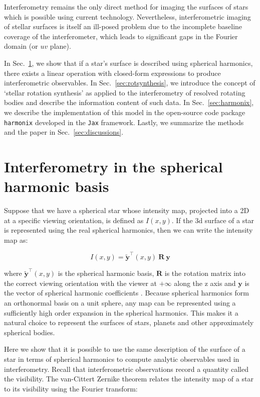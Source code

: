 \documentclass[modern]{aastex631}
\begin{document}
Interferometry remains the only direct method for imaging the surfaces of stars which is possible using current technology. Nevertheless, interferometric imaging of stellar surfaces is itself an ill-posed problem due to the incomplete baseline coverage of the interferometer, which leads to significant gaps in the Fourier domain (or $uv$ plane). 

In Sec.~\ref{sec:maps}, we show that if a star's surface is described using spherical harmonics, there exists a linear operation with closed-form expressions to produce interferometric observables. In Sec.~\ref{sec:rotsynthesis}, we introduce the concept of `stellar rotation synthesis' as applied to the interferometry of resolved rotating bodies and describe the information content of such data. In  Sec.~\ref{sec:harmonix}, we describe the implementation of this model in the open-source code package \texttt{harmonix} developed in the \texttt{Jax} framework. Lastly, we summarize the methods and the paper in Sec.~\ref{sec:discussions}.
\section{Interferometry in the spherical harmonic basis}
\label{sec:maps}

Suppose that we have a spherical star whose intensity map, projected into a 2D at a specific viewing orientation, is defined as $I(x,y)$. If the 3d surface of a star is represented using the real spherical harmonics, then we can write the intensity map as:
 
\begin{equation}
    I(x,y) = \mathbf{\tilde{y}}^\top(x,y) \ \mathbf{R} \ \mathbf{y}
\end{equation}

where $\mathbf{\tilde{y}}^\top(x,y)$ is the spherical harmonic basis, $\mathbf{R}$ is the rotation matrix into the correct viewing orientation with the viewer at $+\infty$ along the z axis and $\mathbf{y}$ is the vector of spherical harmonic coefficients \citep{starry2019}. Because spherical harmonics form an orthonormal basis on a unit sphere, any map can be represented using a sufficiently high order expansion in the spherical harmonics. This makes it a natural choice to represent the surfaces of stars, planets and other approximately spherical bodies.

Here we show that it is possible to use the same description of the surface of a star in terms of spherical harmonics to compute analytic observables used in interferometry. Recall that interferometric observations record a quantity called the visibility. The van-Cittert Zernike theorem relates the intensity map of a star to its visibility using the Fourier transform:
\end{document}
